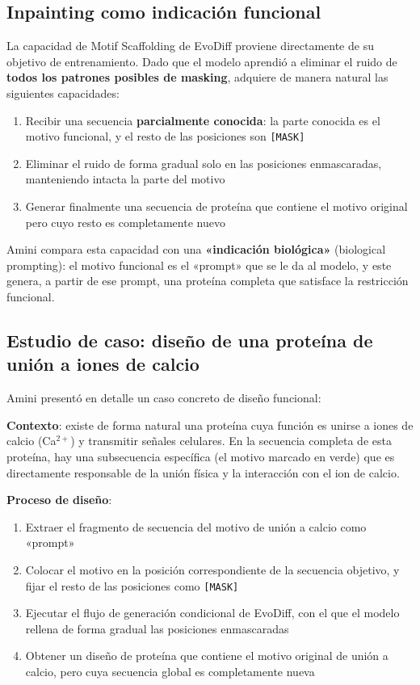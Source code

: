 \documentclass[a4paper]{article}
\begin{document}
\subsection{Inpainting como indicación funcional}

La capacidad de Motif Scaffolding de EvoDiff proviene directamente de su objetivo de entrenamiento. Dado que el modelo aprendió a eliminar el ruido de \textbf{todos los patrones posibles de masking}, adquiere de manera natural las siguientes capacidades:

\begin{enumerate}
    \item Recibir una secuencia \textbf{parcialmente conocida}: la parte conocida es el motivo funcional, y el resto de las posiciones son \texttt{[MASK]}
    \item Eliminar el ruido de forma gradual solo en las posiciones enmascaradas, manteniendo intacta la parte del motivo
    \item Generar finalmente una secuencia de proteína que contiene el motivo original pero cuyo resto es completamente nuevo
\end{enumerate}

Amini compara esta capacidad con una \textbf{«indicación biológica»} (biological prompting): el motivo funcional es el «prompt» que se le da al modelo, y este genera, a partir de ese prompt, una proteína completa que satisface la restricción funcional.

\subsection{Estudio de caso: diseño de una proteína de unión a iones de calcio}

Amini presentó en detalle un caso concreto de diseño funcional:

\textbf{Contexto}: existe de forma natural una proteína cuya función es unirse a iones de calcio (Ca$^{2+}$) y transmitir señales celulares. En la secuencia completa de esta proteína, hay una subsecuencia específica (el motivo marcado en verde) que es directamente responsable de la unión física y la interacción con el ion de calcio.

\textbf{Proceso de diseño}:
\begin{enumerate}
    \item Extraer el fragmento de secuencia del motivo de unión a calcio como «prompt»
    \item Colocar el motivo en la posición correspondiente de la secuencia objetivo, y fijar el resto de las posiciones como \texttt{[MASK]}
    \item Ejecutar el flujo de generación condicional de EvoDiff, con el que el modelo rellena de forma gradual las posiciones enmascaradas
    \item Obtener un diseño de proteína que contiene el motivo original de unión a calcio, pero cuya secuencia global es completamente nueva
\end{enumerate}
\end{document}
